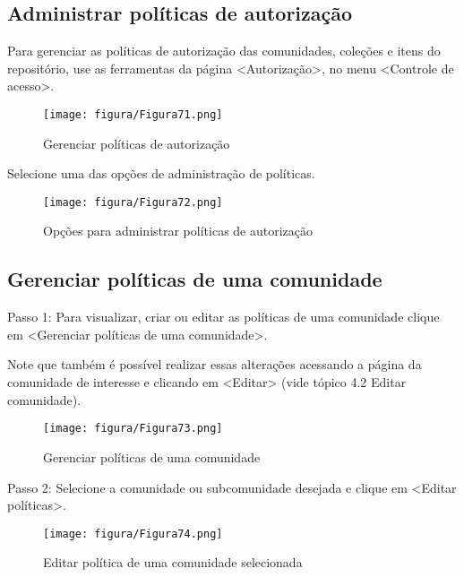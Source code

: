 \documentclass[12pt,hidelinks]{article}
\begin{document}
\newpage
    
    \subsection{Administrar políticas de autorização}
    
    Para gerenciar as políticas de autorização das comunidades, coleções e itens do repositório, use as ferramentas da página <Autorização>, no menu <Controle de acesso>.
    
    \begin{figure}[!htp]
                \centering
                \texttt{[image: figura/Figura71.png]}
                \caption{Gerenciar políticas de autorização}
            \label{Rotulo}
        \end{figure}
    
    Selecione uma das opções de administração de políticas.
    
    \begin{figure}[!htp]
                \centering
                \texttt{[image: figura/Figura72.png]}
                \caption{Opções para administrar políticas de autorização}
            \label{Rotulo}
        \end{figure}
    
    \subsection{Gerenciar políticas de uma comunidade}
    
    Passo 1: Para visualizar, criar ou editar as políticas de uma comunidade clique em <Gerenciar políticas de uma comunidade>.

\newpage

    Note que também é possível realizar essas alterações acessando a página da comunidade de interesse e clicando em <Editar> (vide tópico 4.2 Editar comunidade).
    
    \begin{figure}[!htp]
                \centering
                \texttt{[image: figura/Figura73.png]}
                \caption{Gerenciar políticas de uma comunidade}
            \label{Rotulo}
        \end{figure}
    
    Passo 2: Selecione a comunidade ou subcomunidade desejada e clique em <Editar políticas>.
    
    \begin{figure}[!htp]
                \centering
                \texttt{[image: figura/Figura74.png]}
                \caption{Editar política de uma comunidade selecionada}
            \label{Rotulo}
        \end{figure}
    
\end{document}
